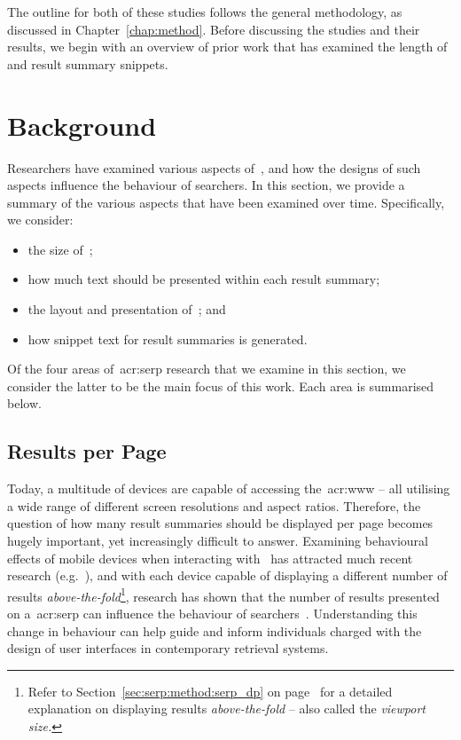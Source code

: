 The outline for both of these studies follows the general methodology, as discussed in Chapter~\ref{chap:method}. Before discussing the studies and their results, we begin with an overview of prior work that has examined the length of~ and result summary snippets.

\section{Background}\label{chap:snippets:background}
Researchers have examined various aspects of~, and how the designs of such aspects influence the behaviour of searchers. In this section, we provide a summary of the various aspects that have been examined over time. Specifically, we consider:

\begin{itemize}
    \item{the size of~;}
    \item{how much text should be presented within each result summary;}
    \item{the layout and presentation of~; and}
    \item{how snippet text for result summaries is generated.}
\end{itemize}

Of the four areas of~\gls{acr:serp} research that we examine in this section, we consider the latter to be the main focus of this work. Each area is summarised below.

\subsection{Results per Page}
Today, a multitude of devices are capable of accessing the~\gls{acr:www} -- all utilising a wide range of different screen resolutions and aspect ratios. Therefore, the question of how many result summaries should be displayed per page becomes hugely important, yet increasingly difficult to answer. Examining behavioural effects of mobile devices when interacting with~ has attracted much recent research (e.g.~\cite{kim2012small_vs_large, kim2014eye_tracking, kim2016pagination_versus_scrolling}), and with each device capable of displaying a different number of results \emph{above-the-fold}\footnote{Refer to Section~\ref{sec:serp:method:serp_dp} on page~\pageref{sec:serp:method:serp_dp} for a detailed explanation on displaying results \emph{above-the-fold} -- also called the \emph{viewport size.}}, research has shown that the number of results presented on a~\gls{acr:serp} can influence the behaviour of searchers~\citep{joachims2005click_model, kim2014eye_tracking}. Understanding this change in behaviour can help guide and inform individuals charged with the design of user interfaces in contemporary retrieval systems.

